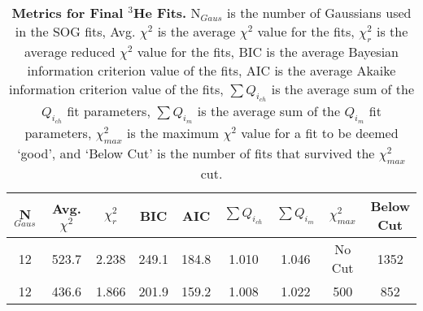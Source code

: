 
\vspace{6mm}
\begin{table}[!h]
\centering
\begin{tabular}{|c c c c c c c c c|}
\hline
\textbf{N$_{Gaus}$} & \textbf{Avg. $\chi^2$} & \textbf{$\chi^2_r$} & \textbf{BIC} & \textbf{AIC} & \textbf{$\sum Q_{i_{ch}}$} & \textbf{$\sum Q_{i_{m}}$} & \textbf{$\chi^2_{max}$} & \makecell{\textbf{Below}\\ \textbf{Cut}} \\
\hline
12 & 523.7 & 2.238 & 249.1 & 184.8 & 1.010 & 1.046 & No Cut & 1352\\
12 & 436.6 & 1.866 & 201.9 & 159.2 & 1.008 & 1.022 & 500 & 852\\
\hline
\end{tabular}
\caption[Metrics for Final $^3$He Fits]{{\bf{Metrics for Final $^3$He Fits.}} N$_{Gaus}$ is the number of Gaussians used in the SOG fits, Avg. $\chi^2$ is the average $\chi^2$ value for the fits, $\chi^2_r$ is the average reduced $\chi^2$ value for the fits, BIC is the average Bayesian information criterion value of the fits, AIC is the average Akaike information criterion value of the fits, $\sum Q_{i_{ch}}$ is the average sum of the $Q_{i_{ch}}$ fit parameters, $\sum Q_{i_{m}}$ is the average sum of the $Q_{i_{m}}$ fit parameters, $\chi^2_{max}$ is the maximum $\chi^2$ value for a fit to be deemed `good', and `Below Cut' is the number of fits that survived the $\chi^2_{max}$ cut.}
\label{tab:3he_fits}
\end{table}


